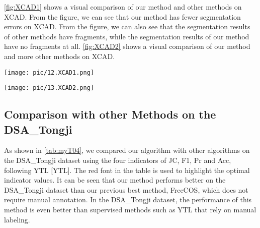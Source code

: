 \cref{fig:XCAD1} shows a visual comparison of our method and other methods on XCAD. From the figure, we can see that our method has fewer segmentation errors on XCAD. From the figure, we can also see that the segmentation results of other methods have fragments, while the segmentation results of our method have no fragments at all. 
\cref{fig:XCAD2} shows a visual comparison of our method and more other methods on XCAD.

\begin{figure*}[htbp]
    \centering
    \texttt{[image: pic/12.XCAD1.png]}
    \caption{Visual analysis on XCAD}
    \label{fig:XCAD1}
\end{figure*}

\begin{figure*}[htbp]
    \centering
    \texttt{[image: pic/13.XCAD2.png]}
    \caption{Visual comparison with more methods on XCAD}
    \label{fig:XCAD2}
\end{figure*}

\subsection{Comparison with other Methods on the DSA\_Tongji}

As shown in \cref{tab:myT04}, we compared our algorithm with other algorithms on the DSA\_Tongji dataset using the four indicators of JC, F1, Pr and Acc, following YTL [YTL]. 
The red font in the table is used to highlight the optimal indicator values. 
It can be seen that our method performs better on the DSA\_Tongji dataset than our previous best method, FreeCOS, which does not require manual annotation. 
In the DSA\_Tongji dataset, the performance of this method is even better than supervised methods such as YTL that rely on manual labeling.

